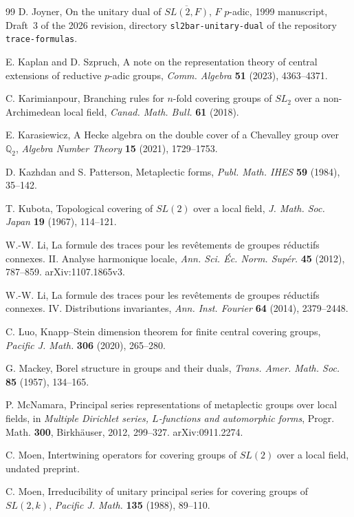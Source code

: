 \documentclass[12pt,letterpaper]{article}
\numberwithin{equation}{section}
\theoremstyle{definition}
\newcommand{\Q}{\mathbb Q}
\begin{document}
\begin{thebibliography}{99}
 D. Joyner, On the unitary dual of $\overline{SL(2,F)}$, $F$ $p$-adic,
1999 manuscript, Draft~3 of the 2026 revision, directory \texttt{sl2bar-unitary-dual} of
the repository \texttt{trace-formulas}.

 E. Kaplan and D. Szpruch, A note on the representation theory of
central extensions of reductive $p$-adic groups, \emph{Comm. Algebra} \textbf{51} (2023),
4363--4371.

 C. Karimianpour, Branching rules for $n$-fold covering groups of
$SL_2$ over a non-Archimedean local field, \emph{Canad. Math. Bull.} \textbf{61} (2018).

 E. Karasiewicz, A Hecke algebra on the double cover of a Chevalley
group over $\Q_2$, \emph{Algebra Number Theory} \textbf{15} (2021), 1729--1753.

 D. Kazhdan and S. Patterson, Metaplectic forms, \emph{Publ. Math.
IHES} \textbf{59} (1984), 35--142.

 T. Kubota, Topological covering of $SL(2)$ over a local field,
\emph{J. Math. Soc. Japan} \textbf{19} (1967), 114--121.

 W.-W. Li, La formule des traces pour les rev\^etements de groupes
r\'eductifs connexes. II. Analyse harmonique locale, \emph{Ann. Sci. \'Ec. Norm. Sup\'er.}
\textbf{45} (2012), 787--859.  arXiv:1107.1865v3.

 W.-W. Li, La formule des traces pour les rev\^etements de groupes
r\'eductifs connexes. IV. Distributions invariantes, \emph{Ann. Inst. Fourier}
\textbf{64} (2014), 2379--2448.

 C. Luo, Knapp--Stein dimension theorem for finite central covering
groups, \emph{Pacific J. Math.} \textbf{306} (2020), 265--280.

 G. Mackey, Borel structure in groups and their duals, \emph{Trans.
Amer. Math. Soc.} \textbf{85} (1957), 134--165.

 P. McNamara, Principal series representations of metaplectic groups
over local fields, in \emph{Multiple Dirichlet series, $L$-functions and automorphic
forms}, Progr. Math. \textbf{300}, Birkh\"auser, 2012, 299--327.  arXiv:0911.2274.

 C. Moen, Intertwining operators for covering groups of $SL(2)$ over a
local field, undated preprint.

 C. Moen, Irreducibility of unitary principal series for covering
groups of $SL(2,k)$, \emph{Pacific J. Math.} \textbf{135} (1988), 89--110.


\end{thebibliography}
\end{document}
